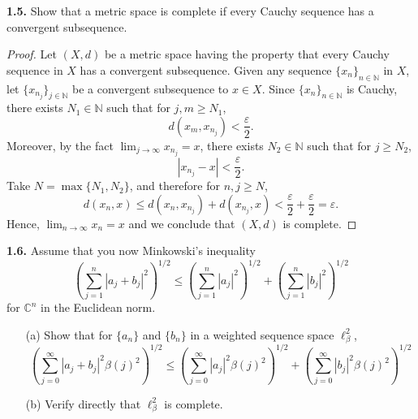 \documentclass[12pt]{article}
\theoremstyle{definition}
\begin{document}
\noindent \textbf{1.5.} Show that a metric space is complete if every Cauchy sequence has a convergent subsequence. 
	\begin{proof}
		Let $(X, d)$ be a metric space having the property that every Cauchy sequence in $X$ has a convergent subsequence. Given any sequence $\{x_n\}_{n \in \mathbb{N}}$ in $X$, let $\{x_{n_j}\}_{j \in \mathbb{N}}$ be a convergent subsequence to $x \in X$. Since $\{x_n\}_{n \in \mathbb{N}}$ is Cauchy, there exists $N_1 \in \mathbb{N}$ such that for $j, m \geq N_1$, $$d(x_m, x_{n_j}) < \frac{\varepsilon}{2}.$$ Moreover, by the fact $\lim_{j \to \infty} x_{n_j} = x$, there exists $N_2 \in \mathbb{N}$ such that for $j \geq N_2$, $$|x_{n_j} - x| < \frac{\varepsilon}{2}.$$ Take $N = \max\{N_1, N_2\}$, and therefore for $n, j \geq N$, 
		 $$d(x_n, x) \leq d(x_n, x_{n_j}) + d(x_{n_j}, x) < \frac{\varepsilon}{2} + \frac{\varepsilon}{2} = \varepsilon.$$ Hence, $\lim_{n \to \infty} x_n = x$ and we conclude that $(X, d)$ is complete.
	\end{proof} 
	
\noindent \textbf{1.6.} Assume that you now Minkowski's inequality $$\left(\sum_{j = 1}^n |a_j + b_j|^2\right)^{1/2} \leq \left(\sum_{j = 1}^n |a_j|^2\right)^{1/2} + \left(\sum_{j = 1}^n |b_j|^2\right)^{1/2}$$ for $\mathbb{C}^n$ in the Euclidean norm. 
	\begin{itemize}
		\item[(a)] Show that for $\{a_n\}$ and $\{b_n\}$ in a weighted sequence space $\ell_\beta^2$, $$\left(\sum_{j = 0}^\infty |a_j + b_j|^2 \beta(j)^2\right)^{1/2} \leq \left(\sum_{j = 0}^\infty |a_j|^2 \beta(j)^2 \right)^{1/2} + \left(\sum_{j = 0}^\infty |b_j|^2 \beta(j)^2\right)^{1/2}$$ 
		
		\item[(b)] Verify directly that $\ell_\beta^2$ is complete. 
	\end{itemize}
	
\end{document}
